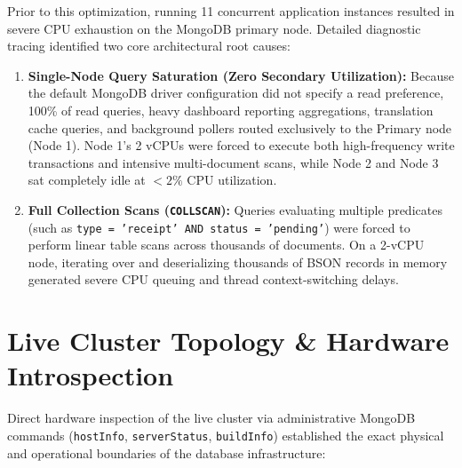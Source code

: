 \documentclass[11pt,a4paper]{article}
\begin{document}
Prior to this optimization, running 11 concurrent application instances resulted in severe CPU exhaustion on the MongoDB primary node. Detailed diagnostic tracing identified two core architectural root causes:

\begin{enumerate}
    \item \textbf{Single-Node Query Saturation (Zero Secondary Utilization):} Because the default MongoDB driver configuration did not specify a read preference, 100\% of read queries, heavy dashboard reporting aggregations, translation cache queries, and background pollers routed exclusively to the Primary node (Node 1). Node 1's 2 vCPUs were forced to execute both high-frequency write transactions and intensive multi-document scans, while Node 2 and Node 3 sat completely idle at $<2\%$ CPU utilization.
    \item \textbf{Full Collection Scans (\texttt{COLLSCAN}):} Queries evaluating multiple predicates (such as \texttt{type = 'receipt' AND status = 'pending'}) were forced to perform linear table scans across thousands of documents. On a 2-vCPU node, iterating over and deserializing thousands of BSON records in memory generated severe CPU queuing and thread context-switching delays.
\end{enumerate}

\section{Live Cluster Topology \& Hardware Introspection}

Direct hardware inspection of the live cluster via administrative MongoDB commands (\texttt{hostInfo}, \texttt{serverStatus}, \texttt{buildInfo}) established the exact physical and operational boundaries of the database infrastructure:
\end{document}
